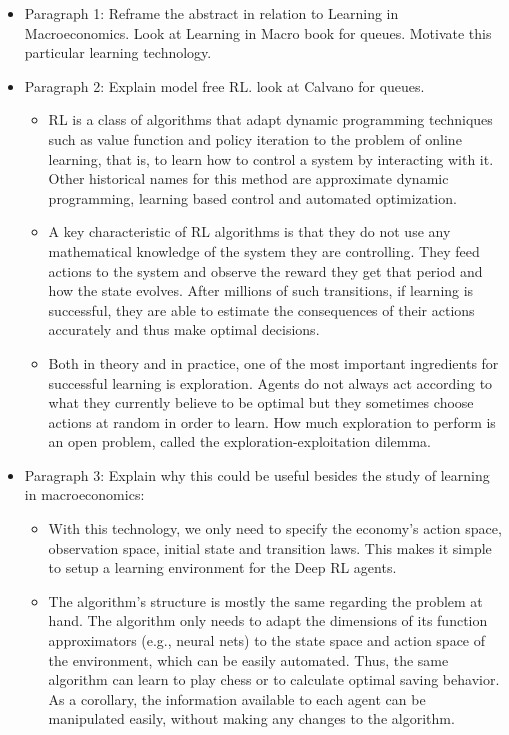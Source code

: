 \documentclass[11pt,english]{article}
\begin{document}
\begin{itemize}
	\item Paragraph 1: Reframe the abstract in relation to Learning in Macroeconomics. Look at Learning in Macro book for queues. Motivate this particular learning technology. \medskip
	
	\item Paragraph 2: Explain model free RL. look at Calvano for queues. \medskip 
	
	\begin{itemize}
		\item RL is a class of algorithms that adapt dynamic programming techniques such as value function and policy iteration to the problem of online learning, that is, to learn how to control a system by interacting with it. Other historical names for this method are approximate dynamic programming, learning based control and automated optimization.  \medskip
		\item A key characteristic of RL algorithms is that they do not use any mathematical knowledge of  the system they are controlling. They feed actions to the system and observe the reward they get that period and how the state evolves. After millions of such transitions, if learning is successful, they are able to estimate the consequences of their actions accurately and thus make optimal decisions. \medskip
		\item Both in theory and in practice, one of the most important ingredients for successful learning is exploration. Agents do not always act according to what they currently believe to be optimal but they sometimes choose actions at random in order to learn. How much exploration to perform is an open problem, called the exploration-exploitation dilemma. \medskip
	\end{itemize}
	
	\item Paragraph 3: Explain why this could be useful besides the study of learning in macroeconomics: \medskip 
	
	\begin{itemize}
		\item With this technology, we only need to specify the economy's action space, observation space, initial state and transition laws. This makes it simple to setup a learning environment for the Deep RL agents. \medskip
		
		\item The algorithm's structure is mostly the same regarding the problem at hand. The algorithm only needs to adapt the dimensions of its function approximators (e.g., neural nets) to the state space and action space of the environment, which can be easily automated. Thus, the same algorithm can learn to play chess or to calculate optimal saving behavior. As a corollary, the information available to each agent can be manipulated easily, without making any changes to the algorithm.  \medskip
	\end{itemize}


\end{itemize}
\end{document}
